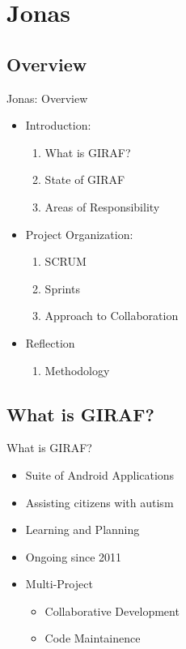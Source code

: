 \section{Jonas}
\subsection{Overview}
\begin{frame}{Jonas: Overview}
\begin{itemize}
	\item Introduction:
  		\begin{enumerate}
			\item What is GIRAF?
			\item State of GIRAF
			\item Areas of Responsibility
		\end{enumerate}
	\item Project Organization:
		\begin{enumerate}
			\item SCRUM
			\item Sprints
			\item Approach to Collaboration
		\end{enumerate}
	\item Reflection
		\begin{enumerate}
			\item Methodology
		\end{enumerate}
\end{itemize}
\end{frame}

\subsection{What is GIRAF?}
\begin{frame}{What is GIRAF?}
\begin{itemize}
	\item Suite of Android Applications
	\item Assisting citizens with autism
	\item Learning and Planning
	\item Ongoing since 2011
	\item Multi-Project
		\begin{itemize}
		    \item Collaborative Development 
  			\item Code Maintainence
		\end{itemize}
\end{itemize}
\end{frame}

